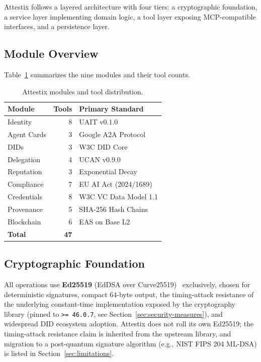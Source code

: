 \documentclass[conference]{IEEEtran}
\begin{document}
Attestix follows a layered architecture with four tiers: a cryptographic foundation, a service layer implementing domain logic, a tool layer exposing MCP-compatible interfaces, and a persistence layer.

\subsection{Module Overview}

Table~\ref{tab:modules} summarizes the nine modules and their tool counts.

\begin{table}[htbp]
\centering
\caption{Attestix modules and tool distribution.}
\label{tab:modules}
\begin{tabular}{lrl}
\toprule
\textbf{Module} & \textbf{Tools} & \textbf{Primary Standard} \\
\midrule
Identity & 8 & UAIT v0.1.0 \\
Agent Cards & 3 & Google A2A Protocol \\
DIDs & 3 & W3C DID Core \\
Delegation & 4 & UCAN v0.9.0 \\
Reputation & 3 & Exponential Decay \\
Compliance & 7 & EU AI Act (2024/1689) \\
Credentials & 8 & W3C VC Data Model 1.1 \\
Provenance & 5 & SHA-256 Hash Chains \\
Blockchain & 6 & EAS on Base L2 \\
\midrule
\textbf{Total} & \textbf{47} & \\
\bottomrule
\end{tabular}
\end{table}

\subsection{Cryptographic Foundation}
\label{sec:crypto}

All operations use \textbf{Ed25519} (EdDSA over Curve25519)~\cite{rfc8032} exclusively, chosen for deterministic signatures, compact 64-byte output, the timing-attack resistance of the underlying constant-time implementation exposed by the cryptography library (pinned to \texttt{\textgreater=\,46.0.7}, see Section~\ref{sec:security-measures}), and widespread DID ecosystem adoption. Attestix does not roll its own Ed25519; the timing-attack resistance claim is inherited from the upstream library, and migration to a post-quantum signature algorithm (e.g., NIST FIPS 204 ML-DSA) is listed in Section~\ref{sec:limitations}.
\end{document}
